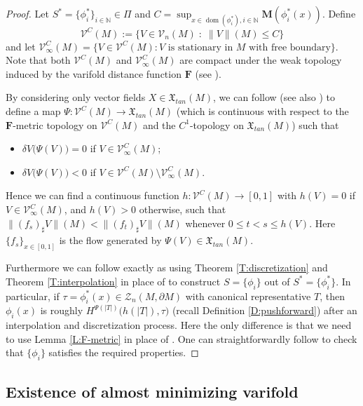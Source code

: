 \documentclass[10pt]{amsart}
\theoremstyle{definition}
\theoremstyle{remark}
\numberwithin{equation}{section}
\newcommand{\V}{\mathcal{V}}
\newcommand{\N}{\mathbb{N}}
\newcommand{\de}{\delta}
\newcommand{\Z}{\mathcal{Z}}
\newcommand{\M}{\mathbf{M}}
\newcommand{\mF}{\mathbf{F}}
\newcommand{\dom}{\operatorname{dom}}
\begin{document}
\begin{proof}
Let $S^*=\{\phi_i^*\}_{i \in \N} \in \Pi$ and $C=\sup_{x \in \dom(\phi^*_i), i \in \N} \M(\phi_i^*(x))$. Define
\[ \V^C(M):=\{V\in\V_n(M) \; : \;  \|V\|(M)\leq C\} \]
and let $\V^C_{\infty}(M)=\{V\in \V^C (M): V \text{ is stationary in $M$ with free boundary}\}$. Note that both $\V^C(M)$ and $\V^C_{\infty}(M)$ are compact under the weak topology induced by the varifold distance function $\mF$ (see \cite[Lemma 3.4]{Li15}). 

By considering only vector fields $X \in \mathfrak{X}_{tan}(M)$, we can follow \cite[Theorem 4.3]{Pitts}\cite[Proposition 8.5]{Marques-Neves14} (see also \cite[Proposition 5.1]{Li15}) to define a map $\Psi : \V^C(M)\rightarrow \mathfrak{X}_{tan}(M)$ (which is continuous with respect to the $\mF$-metric topology on $\V^C(M)$ and the $C^1$-topology on $\mathfrak{X}_{tan}(M)$) such that
\begin{itemize}
\item $\de V\big(\Psi(V)\big)=0$ if $V\in\V^C_{\infty}(M)$;
\item $\de V\big(\Psi(V)\big)<0$ if $V\in\V^C(M) \setminus \V^C_{\infty}(M)$.
\end{itemize}
Hence we can find a continuous function $h: \V^C(M)\rightarrow [0, 1]$ with $h(V)=0$ if $V\in \V^C_{\infty}(M)$, and $h(V)>0$ otherwise, such that $\|(f_s)_\sharp V \|(M)< \| (f_t)_\sharp V \|(M)$ whenever $0 \leq t<s \leq h(V)$. Here $\{f_s\}_{x \in [0,1]}$ is the flow generated by $\Psi(V) \in \mathfrak{X}_{tan}(M)$.


Furthermore we can follow exactly as \cite[pages 765-768]{Marques-Neves14} using Theorem \ref{T:discretization} and Theorem \ref{T:interpolation} in place of \cite[Theorem 13.1, Theorem 14.1]{Marques-Neves14} to construct $S=\{\phi_i\}$ out of $S^*=\{\phi^*_i\}$. In particular, if $\tau =\phi^*_i(x) \in \Z_n(M, \partial M)$ with canonical representative $T$, then $\phi_i(x)$ is roughly $H^{\Psi(|T|)}\big(h(|T|), \tau \big)$ (recall Definition \ref{D:pushforward}) after an interpolation and discretization process. Here the only difference is that we need to use Lemma \ref{L:F-metric} in place of \cite[Lemma 4.1]{Marques-Neves14}. One can straightforwardly follow \cite{Marques-Neves14} to check that $\{\phi_i\}$ satisfies the required properties.
\end{proof}




\subsection{Existence of almost minimizing varifold}
\label{SS:existence-am} 
\end{document}
